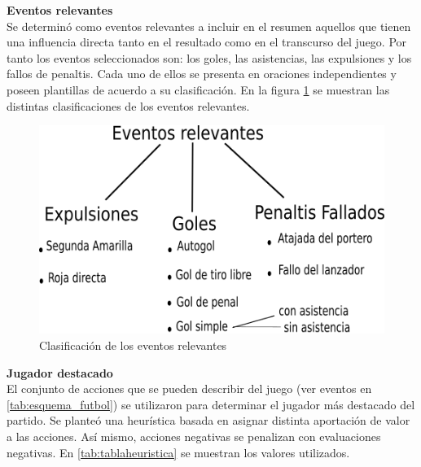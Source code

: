     \textbf{Eventos relevantes}\\

    Se determinó como eventos relevantes a incluir en el resumen aquellos que tienen una influencia directa 
tanto en el resultado como en el transcurso del juego. Por tanto los eventos seleccionados son: los goles, las asistencias, 
las expulsiones y los fallos de penaltis. Cada uno de ellos se presenta en oraciones independientes y poseen plantillas de acuerdo 
a su clasificación. En la figura \ref{fig_clasificacioneventos} se muestran las distintas clasificaciones de los eventos relevantes.\\


    \begin{figure}[!]
        \begin{center}
            \includegraphics[scale=0.9]{Graphics/eventosrelevantesOK3.png}
        \end{center}
        \caption{Clasificación de los eventos relevantes}
        \label{fig_clasificacioneventos}
    \end{figure}

    \textbf{Jugador destacado}\\

    El conjunto de acciones que se pueden describir del juego (ver eventos en \ref{tab:esquema_futbol}) se utilizaron para 
determinar el jugador más destacado del partido. Se planteó una heurística basada en asignar distinta aportación de valor a 
las acciones. Así mismo, acciones negativas se penalizan con evaluaciones negativas.
 En \ref{tab:tablaheuristica} se muestran los valores utilizados.



